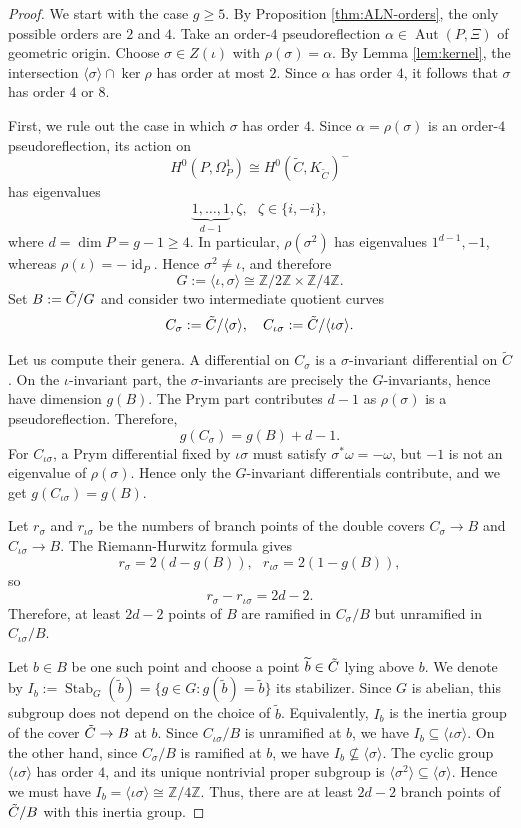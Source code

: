 \documentclass{article}
\numberwithin{equation}{section}
\newcommand{\ZZ}{\mathbb Z}
\newcommand{\tC}{\Tilde{C}}
\newcommand{\s}{\sigma}
\DeclareMathOperator{\Aut}{Aut}
\DeclareMathOperator{\id}{id}
\begin{document}
\begin{proof}
We start with the case $g \geq 5$. By Proposition \ref{thm:ALN-orders}, the only possible orders are $2$ and $4$. Take an order-$4$ pseudoreflection  $\alpha\in\Aut(P,\Xi)$ of geometric origin. Choose $\sigma\in Z(\iota)$ with $\rho(\sigma)=\alpha.$ By Lemma \ref{lem:kernel}, the intersection $\langle\sigma\rangle\cap\ker\rho$ has order at most $2$. Since $\alpha$ has order $4$, it follows that $\sigma$ has order $4$ or $8$.

First, we rule out the case in which $\sigma$ has order $4$. Since $\alpha=\rho(\sigma)$ is an order-$4$ pseudoreflection, its action on $$H^0(P,\Omega_P^1)\cong H^0(\widetilde C,K_{\widetilde C})^-$$
has eigenvalues $$\underbrace{1,\ldots,1}_{d-1},\zeta,
\ \ \  \zeta\in\{i,-i\},$$ where $d=\dim P=g-1\geq4$. In particular, $\rho(\sigma^2)$ has eigenvalues $1^{d-1},-1$, whereas $\rho(\iota)=-\id_P$. Hence $\sigma^2\neq\iota$, and therefore
$$G:=\langle\iota,\sigma\rangle\cong\ZZ/2\ZZ\times\ZZ/4\ZZ.$$
Set $B:=\tC/G$ and consider two intermediate quotient curves
$$C_{\sigma}:=\tC/\langle\sigma\rangle, \ \ \ C_{\iota\sigma}:=\tC/\langle\iota\sigma\rangle.$$

Let us compute their genera. A differential on $C_{\sigma}$ is a $\sigma$-invariant differential on $\widetilde C$. On the $\iota$-invariant part, the $\sigma$-invariants are precisely the $G$-invariants, hence have dimension $g(B)$. The Prym part contributes \(d-1\) as \(\rho(\s)\) is a pseudoreflection. Therefore, $$g(C_{\s})=g(B)+d-1.$$
For $C_{\iota\s}$, a Prym differential fixed by $\iota\sigma$ must satisfy $\sigma^*\omega=-\omega$, but $-1$ is not an eigenvalue of $\rho(\sigma)$. Hence only the $G$-invariant differentials contribute, and we get $g(C_{\iota\sigma}) = g(B)$.

Let $r_{\sigma}$ and $r_{\iota\sigma}$ be the numbers of branch points of the double covers $C_{\sigma} \to B$ and $C_{\iota\sigma}\to B$. The Riemann-Hurwitz formula gives $$r_{\sigma}=2(d-g(B)), \ \ \ r_{\iota\sigma}=2(1-g(B)),$$
so
$$r_{\sigma}-r_{\iota\sigma}=2d-2.$$
Therefore, at least $2d-2$ points of $B$ are ramified in $C_{\sigma}/B$ but unramified in $C_{\iota\sigma}/B$.

Let $b\in B$ be one such point and choose a point $\widetilde b\in \tC$ lying above $b$. We denote by $I_b:=\operatorname{Stab}_G(\widetilde b)
=\{g\in G : g(\widetilde b)=\widetilde b\}$
its stabilizer. Since $G$ is abelian, this subgroup does not depend on the
choice of $\widetilde b$. Equivalently, $I_b$ is the inertia
group of the cover $\tC\to B$ at $b$. Since $C_{\iota\sigma}/B$ is unramified at $b$, we have $I_b\subseteq\langle\iota\sigma\rangle.$
On the other hand, since $C_{\sigma}/B$ is ramified at $b$, we have $I_b\not\subseteq\langle\sigma\rangle.$
The cyclic group $\langle\iota\sigma\rangle$ has order $4$, and its unique nontrivial proper subgroup is $\langle\sigma^2\rangle\subseteq\langle\sigma\rangle$. Hence we must have $I_b=\langle\iota\sigma\rangle\cong\ZZ/4\ZZ.$ Thus, there are at least $2d-2$ branch points of $\tC/B$ with this inertia group.


\end{proof}
\end{document}
